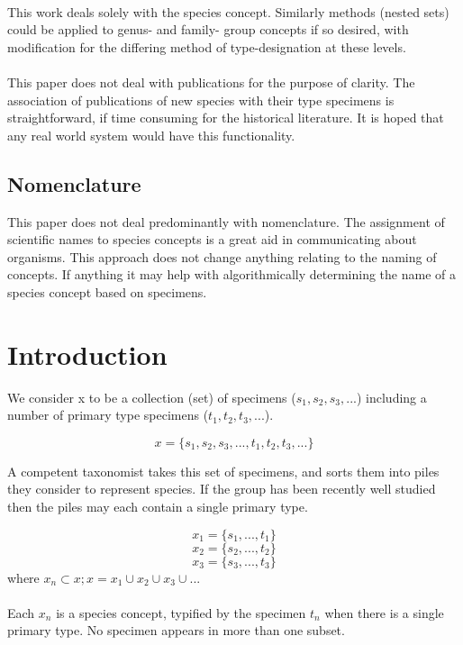 \documentclass{article}
\begin{document}
   \paragraph{}
   This work deals solely with the species concept. Similarly methods (nested sets) could be applied to genus- and family- group concepts if so desired, with modification for the differing method of type-designation at these levels.
   \paragraph{}
   This paper does not deal with publications for the purpose of clarity. The association of publications of new species with their type specimens is straightforward, if time consuming for the historical literature. It is hoped that any real world system would have this functionality.
   \subsection{Nomenclature}
   This paper does not deal predominantly with nomenclature. The assignment of scientific names to species concepts is a great aid in communicating about organisms. This approach does not change anything relating to the naming of concepts. If anything it may help with algorithmically determining the name of a species concept based on specimens.
   \section{Introduction}
   We consider x to be a collection (set) of specimens ($s_1, s_2, s_3, ...$) including a number of primary type specimens ($t_1, t_2, t_3, ...$).
   
   \[x = \{s_1, s_2, s_3, ..., t_1, t_2, t_3, ...\}\]
   
   A competent taxonomist takes this set of specimens, and sorts them into piles they consider to represent species. If the group has been recently well studied then the piles may each contain a single primary type.

   \[x_1 = \{s_1, ..., t_1\}\]
   \[x_2 = \{s_2, ..., t_2\}\]
   \[x_3 = \{s_3, ..., t_3\}\]
   where $x_n \subset x; x= x_1 \cup x_2 \cup x_3 \cup ...$
   \paragraph{}
   Each $x_n$ is a species concept, typified by the specimen $t_n$ when there is a single primary type. No specimen appears in more than one subset.
   
\end{document}
